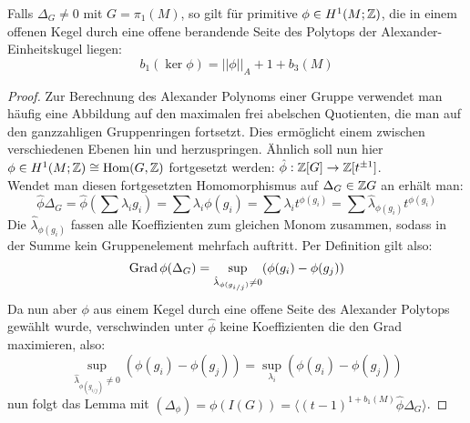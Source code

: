 \begin{lem}
\label{lem:alexnorm}
	Falls $\Delta_G \neq 0$ mit $G=\pi_1(M)$, so gilt für primitive $\phi \in H^1(M;\mathbb{Z})$, die in einem offenen Kegel durch eine offene berandende Seite des Polytops der Alexander-Einheitskugel liegen:
	\[
		b_1(\ker\phi) = ||\phi||_A + 1 + b_3(M)
	\]
\end{lem}
\begin{proof}
	Zur Berechnung des Alexander Polynoms einer Gruppe verwendet man häufig eine Abbildung auf den maximalen frei abelschen Quotienten, die man auf den ganzzahligen Gruppenringen fortsetzt. Dies ermöglicht einem zwischen verschiedenen Ebenen hin und herzuspringen. Ähnlich soll nun hier $\phi \in H^1(M;\mathbb{Z}) \cong \operatorname{Hom}(G,\mathbb{Z}) $ fortgesetzt werden: $		\hat \phi:\mathbb{Z}[G] \to \mathbb{Z}[t^{\pm 1}]$.\\
	Wendet man diesen fortgesetzten Homomorphismus auf $\Delta_G\in \mathbb{Z} G$ an erhält man: \[
		\hat \phi \Delta_G = \hat \phi (\sum \lambda_i g_i)= \sum \lambda_i \phi(g_i) = \sum \lambda_i t^{\phi(g_i)} = \sum \hat \lambda_{\phi(g_i)} t^{\phi(g_i)}
	\]
	Die $\hat \lambda_{\phi(g_i)}$ fassen alle Koeffizienten zum gleichen Monom zusammen, sodass in der Summe kein Gruppenelement mehrfach auftritt. Per Definition gilt also:
	\[
		\operatorname{Grad} \phi(\Delta_G) = \sup_{\hat \lambda_{\phi(g_{i/j})} \neq 0} (\phi(g_i)- \phi(g_j))
	\]
	Da nun aber $\phi$ aus einem Kegel durch eine offene Seite des Alexander Polytops gewählt wurde, verschwinden unter $\hat \phi$ keine Koeffizienten die den Grad maximieren, also:
	\[
		\sup_{\hat \lambda_{\phi(g_{i/j})} \neq 0} (\phi(g_i)- \phi(g_j)) = \sup_{\lambda_i}(\phi(g_i)- \phi(g_j))
	\]
	nun folgt das Lemma mit $(\Delta_\phi)=\phi(I(G))=\langle(t-1)^{1+b_1(M)}\hat\phi\Delta_G \rangle	$.
\end{proof}
